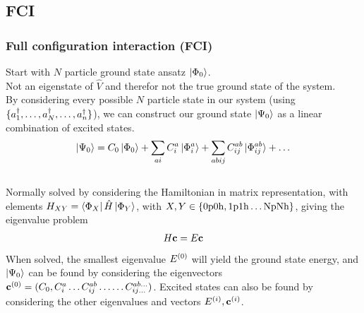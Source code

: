 \documentclass[
11pt,notheorems,hyperref={pdfauthor=whatever}
]{beamer}
\begin{document}
\subsection{FCI}
\begin{frame}
    \frametitle{Full configuration interaction (FCI)}

    Start with $N$ particle ground state ansatz $\ket{\Phi_0}$.
    \\[10pt]
    Not an eigenstate of $\hat{V}$ and therefor not the true ground state of the system.
    \\[10pt]
    By considering every possible $N$ particle state in our system (using $\{ a_{1}^{\dagger},\ldots,a_{N}^{\dagger},\ldots,a_{n}^{\dagger} \}$), we can construct our ground state $\ket{\Psi_0}$ as a linear combination of excited states.
    \begin{align*}
        \ket{\Psi_0} = C_0\ket{\Phi_0} + \sum_{ai} C_i^a \ket{\Phi_{i}^{a}} + \sum_{abij} C_{ij}^{ab} \ket{\Phi_{ij}^{ab}} + \ldots
    \end{align*} 
    \\[10pt] 
    Normally solved by considering the Hamiltonian in matrix representation, with elements $H_{XY} = \bra{\Phi_X}\hat{H}\ket{\Phi_Y}$, with $X, Y \in \{ \text{0p0h},\text{1p1h}\ldots\text{NpNh} \}$, giving the eigenvalue problem 
    \begin{align*}
        H \bold{c} = E\bold{c}
    \end{align*}
    When solved, the smallest eigenvalue $E^{(0)}$ will yield the ground state energy, and $\ket{\Psi_0}$ can be found by considering the eigenvectors $\bold{c}^{(0)} = (C_0, C_{i}^{a} \ldots C_{ij}^{ab} \ldots \ldots C_{ij\ldots}^{ab\ldots})$. Excited states can also be found by considering the other eigenvalues and vectors $E^{(i)}, \bold{c}^{(i)}$.
\end{frame}
\end{document}
